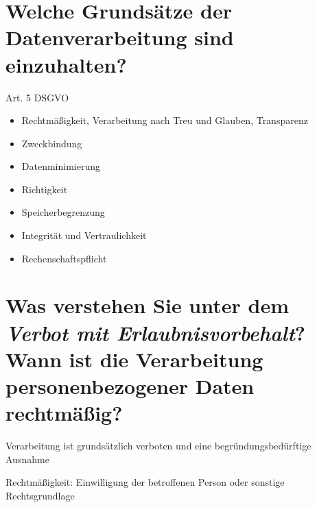 \documentclass{article}
\begin{document}
	\section*{Welche Grundsätze der Datenverarbeitung sind einzuhalten?}
	Art. 5 DSGVO
	\begin{itemize}
		\item Rechtmäßigkeit, Verarbeitung nach Treu und Glauben, Transparenz
		\item Zweckbindung
		\item Datenminimierung
		\item Richtigkeit
		\item Speicherbegrenzung
		\item Integrität und Vertraulichkeit
		\item Rechenschaftspflicht
	\end{itemize}
	
	\section*{Was verstehen Sie unter dem \textit{Verbot mit Erlaubnisvorbehalt}? Wann ist die Verarbeitung personenbezogener Daten rechtmäßig?}
	Verarbeitung ist grundsätzlich verboten und eine begründungsbedürftige Ausnahme
	
	Rechtmäßigkeit: Einwilligung der betroffenen Person oder sonstige Rechtsgrundlage
\end{document}
